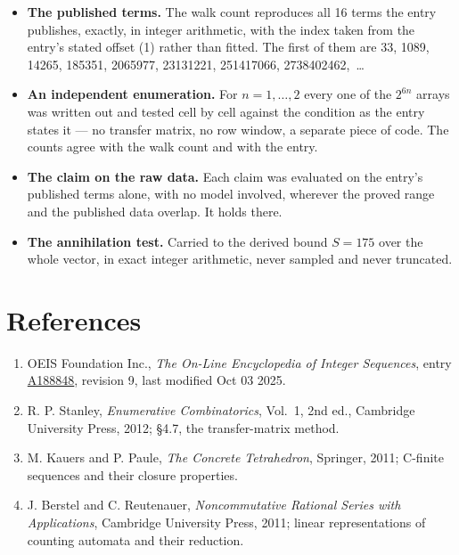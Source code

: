 \documentclass[11pt]{article}
\theoremstyle{definition}
\begin{document}
\begin{itemize}

\item {\bfseries The published terms.} The walk count reproduces all 16 terms the entry publishes, exactly, in integer arithmetic, with the index taken from the entry's stated offset (1) rather than fitted. The first of them are 33, 1089, 14265, 185351, 2065977, 23131221, 251417066, 2738402462,~\dots

\item {\bfseries An independent enumeration.} For $n = 1,\dots,2$ every one of the $2^{6n}$ arrays was written out and tested cell by cell against the condition as the entry states it --- no transfer matrix, no row window, a separate piece of code. The counts agree with the walk count and with the entry.

\item {\bfseries The claim on the raw data.} Each claim was evaluated on the entry's published terms alone, with no model involved, wherever the proved range and the published data overlap. It holds there.

\item {\bfseries The annihilation test.} Carried to the derived bound $S = 175$ over the whole vector, in exact integer arithmetic, never sampled and never truncated.

\end{itemize}

\section{References}

\begin{enumerate}

\item OEIS Foundation Inc., \emph{The On-Line Encyclopedia of Integer Sequences}, entry \href{https://oeis.org/A188848}{A188848}, revision 9, last modified Oct 03 2025.

\item R. P. Stanley, \emph{Enumerative Combinatorics}, Vol.~1, 2nd ed., Cambridge University Press, 2012; \S4.7, the transfer-matrix method.

\item M. Kauers and P. Paule, \emph{The Concrete Tetrahedron}, Springer, 2011; C-finite sequences and their closure properties.

\item J. Berstel and C. Reutenauer, \emph{Noncommutative Rational Series with Applications}, Cambridge University Press, 2011; linear representations of counting automata and their reduction.

\end{enumerate}
\end{document}
